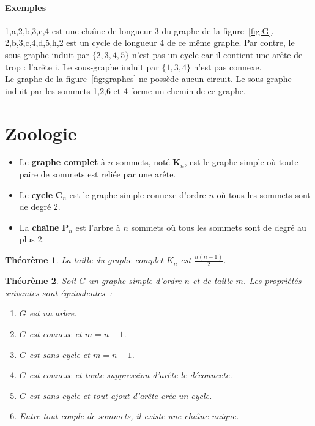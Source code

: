 \documentclass[11pt,a4paper]{report}
\newtheorem{theorem}{Théorème}
\begin{document}
\paragraph{Exemples}
1,a,2,b,3,c,4 est une cha\^{\i}ne de longueur 3 du graphe de la 
figure~\ref{fig:G}.
2,b,3,c,4,d,5,h,2 est un cycle de longueur 4 de ce m\^eme graphe. Par contre,
le sous-graphe induit par $\{2,3,4,5\}$ n'est pas un cycle car il contient une
ar\^ete de trop : l'ar\^ete i. Le sous-graphe induit par $\{1, 3, 4\}$ n'est pas
connexe.\\
Le graphe de la figure~\ref{fig:graphes} ne poss\`ede aucun circuit. Le
sous-graphe induit par les sommets 1,2,6 et 4 forme un chemin de ce graphe.



\section{Zoologie}

\begin{itemize}
\item Le {\bf graphe complet} \`a $n$ sommets, not\'e ${\mathbf K_n}$, est 
le graphe simple
o\`u toute paire de sommets est reli\'ee par une ar\^ete.
\item Le {\bf cycle} ${\mathbf C_n}$ est le graphe simple connexe 
d'ordre $n$ o\`u tous les sommets sont de degr\'e 2.
\item La {\bf cha\^{\i}ne} ${\mathbf P_n}$ est l'arbre \`a $n$ sommets 
o\`u tous les sommets sont de degr\'e au plus 2.
\end{itemize}


\begin{theorem}
La taille du graphe complet $K_n$ est $\frac{n(n-1)}{2}$.
\end{theorem}

\begin{theorem}
Soit $G$ un graphe simple d'ordre $n$ et de taille $m$. Les propri\'et\'es
suivantes sont \'equivalentes~:
\begin{enumerate}
\item $G$ est un arbre.
\item $G$ est connexe et $m = n-1$.
\item $G$ est sans cycle et $m = n-1$.
\item $G$ est connexe et toute suppression d'ar\^ete le d\'econnecte.
\item $G$ est sans cycle et tout ajout d'ar\^ete cr\'ee un cycle.
\item Entre tout couple de sommets, il existe une cha\^{\i}ne unique.
\end{enumerate}
\end{theorem}
\end{document}
